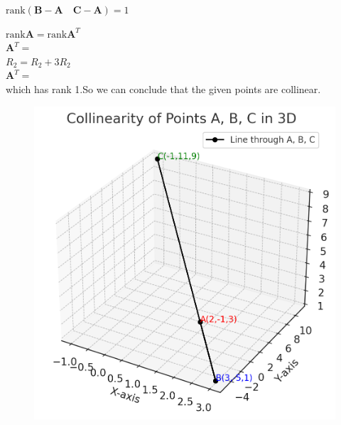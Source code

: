 \documentclass[journal]{IEEEtran}
\begin{document}
\begin{center}
    
$
\text{rank}\left(\textbf{B} - \textbf{A} \quad \textbf{C} - \textbf{A}\right) = 1
$

$
\text{rank} \textbf{A} = \text{rank} \textbf{A}^{T}
$\\
\vspace{0.5cm}
$\textbf{A}^{T}=$\\
\vspace{0.4cm}
$R_{2} = R_{2} + 3R_{2}$\\
\vspace{0.4cm}
$\textbf{A}^{T}=$\\
\vspace{0.4cm}
 which has rank 1.So we can conclude that the given points are collinear.
\begin{figure}
    \centering
    \includegraphics[width=0.5\linewidth]{Beamer/figs/collinear_points.png}
    \caption{}
    \label{fig:placeholder}
\end{figure}


\end{center}
\end{document}
